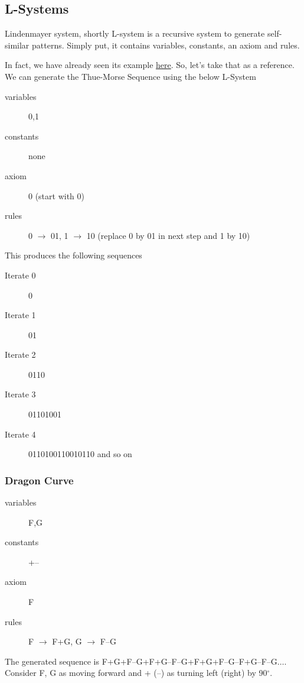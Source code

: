 \subsection{L-Systems}{\label{pp:lsystems}}
Lindenmayer system, shortly L-system is a recursive system to generate self-similar patterns.
Simply put, it contains variables, constants, an axiom and rules.

In fact, we have already seen its example \hyperref[pp:thuemorsesequence]{here}. So, let's take that as a reference. We can generate the Thue-Morse Sequence using the below L-System
\begin{description}
	\item[variables] 0,1
	\item[constants] none
	\item[axiom] 0 (start with 0)
	\item[rules] 0 $\rightarrow$ 01, 1 $\rightarrow$ 10 (replace 0 by 01 in next step and 1 by 10)
\end{description}
This produces the following sequences
\begin{description}
	\item[Iterate 0] 0
	\item[Iterate 1] 01
	\item[Iterate 2] 0110
	\item[Iterate 3] 01101001
	\item[Iterate 4] 0110100110010110 and so on
\end{description}
\subsubsection{Dragon Curve}{\label{pp:dragoncurve}}
\begin{description}
	\item[variables] F,G
	\item[constants] +--
	\item[axiom] F
	\item[rules] F $\rightarrow$ F+G, G $\rightarrow$ F--G
\end{description}
The generated sequence is F+G+F--G+F+G--F--G+F+G+F--G--F+G--F--G$\ldots$. Consider F, G as moving forward and + (--) as turning left (right) by 90$^\circ$.

